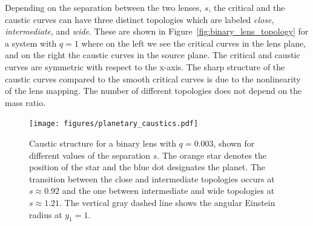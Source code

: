 \documentclass[12pt,dvipsnames]{report}
\begin{document}
Depending on the separation between the two lenses, $s$, the critical and the
caustic curves can have three distinct topologies which are labeled
\emph{close}, \emph{intermediate}, and \emph{wide}. These are shown in
Figure~\ref{fig:binary_lens_topology} for a system with $q=1$ where on the left
we see the critical curves in the lens plane, and on the right the caustic
curves in the source plane. The critical and caustic curves are symmetric with
respect to the x-axis. The sharp structure of the caustic curves compared to
the smooth critical curves is due to the nonlinearity of the lens mapping. The
number of different topologies does not depend on the mass ratio.

\begin{figure}[t]
    \centering
    \texttt{[image: figures/planetary\_caustics.pdf]}
    \caption{Caustic structure for a binary lens with $q=0.003$, shown for different
        values of the separation $s$. The orange star denotes the position of the star and
        the blue dot designates the planet.
        The transition between the close and intermediate
        topologies occurs at $s\approx 0.92$ and the one between intermediate and wide
        topologies at $s\approx 1.21$. The vertical gray dashed line shows the angular
        Einstein radius at $y_1=1$. }
    \label{fig:planetary_caustics}
\end{figure}
\end{document}
